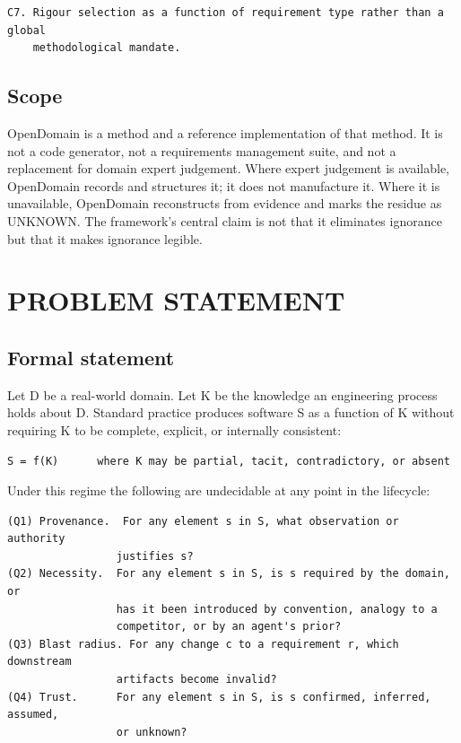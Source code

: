 \documentclass[11pt,a4paper]{article}
\begin{document}
\begin{Verbatim}[fontsize=\footnotesize,breaklines=true,breakanywhere=true,breakautoindent=false,samepage=false]
C7. Rigour selection as a function of requirement type rather than a global
    methodological mandate.
\end{Verbatim}

\subsection{Scope}

OpenDomain is a method and a reference implementation of that method. It is not a code generator, not a requirements management suite, and not a replacement for domain expert judgement. Where expert judgement is available, OpenDomain records and structures it; it does not manufacture it. Where it is unavailable, OpenDomain reconstructs from evidence and marks the residue as UNKNOWN. The framework's central claim is not that it eliminates ignorance but that it makes ignorance legible.

\section{PROBLEM STATEMENT}

\subsection{Formal statement}

Let D be a real-world domain. Let K be the knowledge an engineering process holds about D. Standard practice produces software S as a function of K without requiring K to be complete, explicit, or internally consistent:

\begin{Verbatim}[fontsize=\footnotesize,breaklines=true,breakanywhere=true,breakautoindent=false,samepage=false]
S = f(K)      where K may be partial, tacit, contradictory, or absent
\end{Verbatim}

Under this regime the following are undecidable at any point in the lifecycle:

\begin{Verbatim}[fontsize=\footnotesize,breaklines=true,breakanywhere=true,breakautoindent=false,samepage=false]
(Q1) Provenance.  For any element s in S, what observation or authority
                 justifies s?
(Q2) Necessity.  For any element s in S, is s required by the domain, or
                 has it been introduced by convention, analogy to a
                 competitor, or by an agent's prior?
(Q3) Blast radius. For any change c to a requirement r, which downstream
                 artifacts become invalid?
(Q4) Trust.      For any element s in S, is s confirmed, inferred, assumed,
                 or unknown?
\end{Verbatim}
\end{document}
